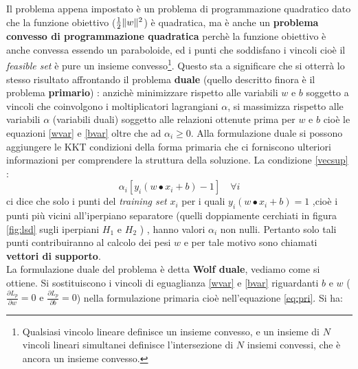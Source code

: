 Il problema appena impostato è un problema di programmazione quadratico dato che la funzione obiettivo ($\frac{1}{2}\lVert w\rVert^2$) è quadratica, ma è anche un \textbf{problema convesso di programmazione quadratica} perchè la funzione obiettivo è anche convessa essendo un paraboloide, ed i punti che soddisfano i vincoli cioè il \textit{feasible set} è pure un insieme convesso\footnote{Qualsiasi vincolo lineare definisce un insieme convesso, e un insieme di $N$ vincoli lineari simultanei definisce l'intersezione di $N$ insiemi convessi, che è ancora un insieme convesso.}. Questo sta a significare che si otterrà lo stesso risultato affrontando il problema \textbf{duale} (quello descritto finora è il problema \textbf{primario}) : anzichè minimizzare rispetto alle variabili $w \text{ e } b$ soggetto a vincoli che coinvolgono i moltiplicatori lagrangiani $\alpha$, si massimizza rispetto alle variabili $\alpha$ (variabili duali) soggetto alle relazioni ottenute prima per $w \text{ e } b$ cioè le equazioni \eqref{wvar} e \eqref{bvar} oltre che ad $\alpha_{i} \geq 0$. Alla formulazione duale si possono aggiungere le KKT condizioni della forma primaria che ci forniscono ulteriori informazioni per comprendere la struttura della soluzione. La condizione  \eqref{vecsup} :
\[
\alpha_{i}[y_{i}(w \bullet x_i + b) - 1] \quad \forall i
\]
ci dice che solo i punti del \textit{training set} $x_i$ per i quali $y_{i}(w \bullet x_i + b) = 1$ ,cioè i punti più vicini all'iperpiano separatore (quelli doppiamente cerchiati in figura \ref{fig:lsd} sugli iperpiani $H_{1}$ e $H_{2}$ ) , hanno valori $\alpha_{i}$ non nulli. Pertanto solo tali punti contribuiranno al calcolo dei pesi $w$ e per tale motivo sono chiamati \textbf{vettori di supporto}.\\
La formulazione duale del problema è detta \textbf{Wolf duale}, vediamo come si ottiene. Si sostituiscono i vincoli di eguaglianza \eqref{wvar} e \eqref{bvar} riguardanti $b$ e $w$ ($\frac{\partial L_{p}}{\partial w} = 0 \text{ e } \frac{\partial L_{p}}{\partial b} = 0$) nella formulazione primaria cioè nell'equazione \eqref{eq:pri}. Si ha:
